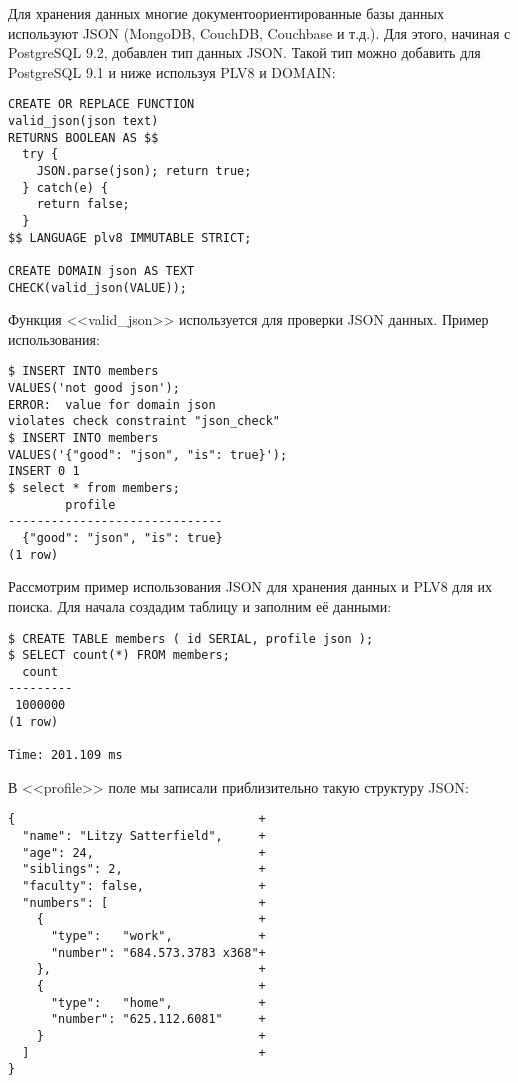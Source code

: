 Для хранения данных многие документоориентированные базы данных используют JSON (MongoDB, CouchDB, Couchbase и т.д.). Для этого, начиная с PostgreSQL 9.2, добавлен тип данных JSON. Такой тип можно добавить для PostgreSQL 9.1 и ниже используя PLV8 и DOMAIN:

\begin{lstlisting}[label=lst:plv8js7,caption=Создание типа JSON]
CREATE OR REPLACE FUNCTION
valid_json(json text)
RETURNS BOOLEAN AS $$
  try {
    JSON.parse(json); return true;
  } catch(e) {
    return false;
  }
$$ LANGUAGE plv8 IMMUTABLE STRICT;

CREATE DOMAIN json AS TEXT
CHECK(valid_json(VALUE));
\end{lstlisting}

Функция <<valid\_json>> используется для проверки JSON данных. Пример использования:

\begin{lstlisting}[label=lst:plv8js8,caption=Проверка JSON]
$ INSERT INTO members
VALUES('not good json');
ERROR:  value for domain json
violates check constraint "json_check"
$ INSERT INTO members
VALUES('{"good": "json", "is": true}');
INSERT 0 1
$ select * from members;
	    profile
------------------------------
  {"good": "json", "is": true}
(1 row)
\end{lstlisting}

Рассмотрим пример использования JSON для хранения данных и PLV8 для их поиска. Для начала создадим таблицу и заполним её данными:

\begin{lstlisting}[label=lst:plv8js9,caption=Таблица с JSON полем]
$ CREATE TABLE members ( id SERIAL, profile json );
$ SELECT count(*) FROM members;
  count
---------
 1000000
(1 row)

Time: 201.109 ms
\end{lstlisting}

В <<profile>> поле мы записали приблизительно такую структуру JSON:

\begin{lstlisting}[label=lst:plv8js10,caption=JSON структура]
{                                  +
  "name": "Litzy Satterfield",     +
  "age": 24,                       +
  "siblings": 2,                   +
  "faculty": false,                +
  "numbers": [                     +
    {                              +
      "type":   "work",            +
      "number": "684.573.3783 x368"+
    },                             +
    {                              +
      "type":   "home",            +
      "number": "625.112.6081"     +
    }                              +
  ]                                +
}
\end{lstlisting}


